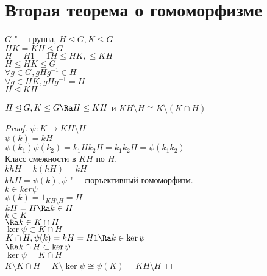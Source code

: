 ﻿\section{Вторая теорема о гомоморфизме}
$G$ "--- группа, $H \unlhd G, K \le G$\\
$HK = KH \le G$\\
$H = H1 = 1H \le HK, \le KH$\\

$H \le HK \le G$\\
$\forall g \in G, gHg^{-1} \in H$\\
$\forall g \in HK, gHg^{-1} = H$\\
$H \unlhd KH$\\
\begin{theorem}
$H \unlhd G, K \le G \Ra H \le KH$ и $KH\setminus H \cong K \setminus (K \cap H)$\\
\end{theorem}
\begin{proof}
$\psi \colon K \to KH \setminus H$\\
$\psi(k) = kH$\\
$\psi(k_1)\psi(k_2) = k_1Hk_2H = k_1k_2H = \psi(k_1k_2)$\\

Класс смежности в $KH$ по $H$.\\
$khH = k(hH) = kH$\\
$khH = \psi(k), \psi$ "--- сюръективный гомоморфизм.\\

$k \in ker \psi$\\
$\psi(k) = 1_{KH \setminus H} = H$\\
$kH = H \Ra k \in H$\\
$k \in K$\\
$\Ra k \in  K \cap H$\\

$\ker \psi \subset K \cap H$\\
$K \cap H, \psi(k) = kH = H1 \Ra k \in \ker \psi$\\
$\Ra k \cap H \subset \ker \psi$\\
$\ker \psi = K \cap H$\\

$K \setminus K \cap H = K \setminus \ker \psi \cong \psi(K) = KH\setminus H$
\end{proof}

